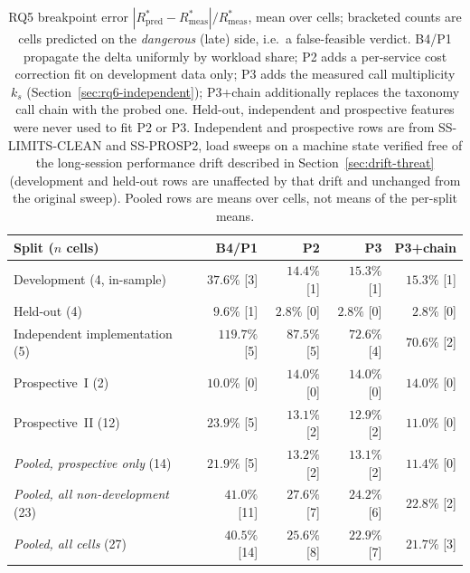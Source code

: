 \documentclass[journal, 10pt]{IEEEtran}
\begin{document}
\begin{table}[!t]
\centering
\caption{RQ5 breakpoint error $|R^{*}_{\text{pred}}-R^{*}_{\text{meas}}|/R^{*}_{\text{meas}}$,
mean over cells; bracketed counts are cells predicted on the \emph{dangerous}
(late) side, i.e.\ a false-feasible verdict. B4/P1 propagate the delta uniformly
by workload share; P2 adds a per-service cost correction fit on development data
only; P3 adds the measured call multiplicity $k_s$
(Section~\ref{sec:rq6-independent}); P3+chain additionally replaces the taxonomy
call chain with the probed one. Held-out, independent and prospective features
were never used to fit P2 or P3. Independent and prospective rows are from
\textsc{SS-LIMITS-CLEAN} and \textsc{SS-PROSP2}, load sweeps on a machine state
verified free of the long-session performance drift described in
Section~\ref{sec:drift-threat} (development and held-out rows are unaffected by
that drift and unchanged from the original sweep). Pooled rows are means over
cells, not means of the per-split means.}
\label{tab:rq6-error}
\begin{tabular}{lrrrr}
\toprule
Split ($n$ cells) & B4/P1 & P2 & P3 & P3+chain \\
\midrule
Development (4, in-sample)     & $37.6\%$ [3] & $14.4\%$ [1] & $15.3\%$ [1] & $15.3\%$ [1] \\
Held-out (4)                   & $9.6\%$ [1]  & $\mathbf{2.8\%}$ [0] & $2.8\%$ [0] & $2.8\%$ [0] \\
Independent implementation (5) & $119.7\%$ [5] & $87.5\%$ [5] & $72.6\%$ [4] & $\mathbf{70.6\%}$ [2] \\
Prospective~I (2)              & $10.0\%$ [0] & $14.0\%$ [0] & $14.0\%$ [0] & $14.0\%$ [0] \\
Prospective~II (12)            & $23.9\%$ [5] & $13.1\%$ [2] & $12.9\%$ [2] & $\mathbf{11.0\%}$ [0] \\
\midrule
\emph{Pooled, prospective only} (14) & $21.9\%$ [5] & $13.2\%$ [2] & $13.1\%$ [2] & $\mathbf{11.4\%}$ [0] \\
\emph{Pooled, all non-development} (23) & $41.0\%$ [11] & $27.6\%$ [7] & $24.2\%$ [6] & $\mathbf{22.8\%}$ [2] \\
\emph{Pooled, all cells} (27)  & $40.5\%$ [14] & $25.6\%$ [8] & $22.9\%$ [7] & $\mathbf{21.7\%}$ [3] \\
\bottomrule
\end{tabular}
\end{table}
\end{document}

